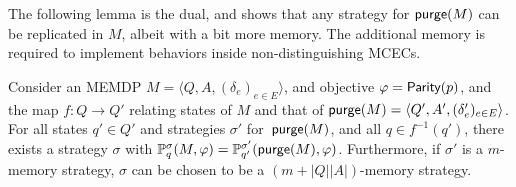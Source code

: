 \documentclass[a4paper,USenglish,cleveref, autoref, thm-restate]{lipics-v2021}
\def\abs#1{\ensuremath{\lvert #1 \rvert}}
\newcommand{\tuple}[1]{\langle #1 \rangle}
\newcommand*{\pr}{\mathbb{P}}
\newcommand\Parity{\textrm{\sf Parity}}
\def\Act{A}
\newcommand\purge[1]{\textrm{\sf purge}(#1)}
\begin{document}
The following lemma is the dual, and shows that any strategy for $\purge{M}$ can be replicated in $M$,
albeit with a bit more memory. The additional memory is required to implement behaviors inside non-distinguishing MCECs.


\begin{lemma}
  \label{lemma:removing-nondist-cecs-stratmap-2}
    Consider an MEMDP $M=\tuple{Q,A,(\delta_e)_{e\in E}}$, and objective $\varphi=\Parity(p)$,
    and the map $f:Q\rightarrow Q'$ relating states of $M$ and that of $\purge{M} = \tuple{Q',A',(\delta_e')_{e\in E}}$.
    For all states $q'\in Q'$ and strategies $\sigma'$ for~$\purge{M}$, and all $q \in f^{-1}(q')$, 
    there exists a strategy $\sigma$ with
    $\pr_{q}^\sigma(M,\varphi) = \pr_{q'}^{\sigma'}(\purge{M},\varphi)$.
    Furthermore, if $\sigma'$ is a $m$-memory strategy, $\sigma$ can be chosen to be a
    $(m+\abs{Q}\abs{\Act})$-memory strategy.
\end{lemma}
\end{document}
